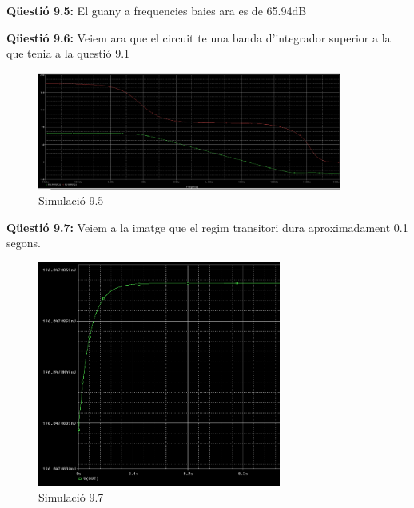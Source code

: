 \documentclass[12pt, a4papre]{article}
\begin{document}
	\textbf{Qüestió 9.5:} El guany a frequencies baies ara es de 65.94dB
	
	\textbf{Qüestió 9.6:} Veiem ara que el circuit te una banda d'integrador superior a la que tenia a la questió 9.1
	
	\begin{figure}[H]
		\begin{center}
		\includegraphics[width=100mm]{9_5.PNG}
		\caption{Simulació 9.5}
		\end{center}
	\end{figure}
	
	\textbf{Qüestió 9.7:} Veiem a la imatge que el regim transitori dura aproximadament 0.1 segons.
	
	\begin{figure}[H]
		\begin{center}
		\includegraphics[width=80mm]{9_7.PNG}
		\caption{Simulació 9.7}
		\end{center}
	\end{figure}
	
\end{document}
